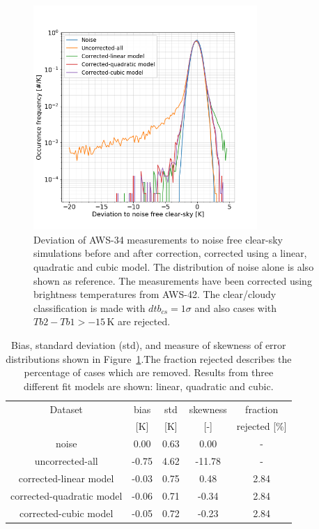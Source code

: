 \documentclass[12pt]{article}
\begin{document}
\begin{figure}[!tb]
	\centering
	\includegraphics[height=85mm]{PDF_corrected_AWS-34_AWS-42_allfits}
	\caption{Deviation of AWS-34 measurements to noise free clear-sky
      simulations before and after correction, corrected using a linear,
      quadratic and cubic model. The distribution of noise alone is also shown
      as reference. The measurements have been corrected using brightness
      temperatures from AWS-42. The clear/cloudy classification is made with $dtb_{cs} = 1\sigma$ and also cases with $Tb2 - Tb1 > -15$\,K are rejected.}
	\label{fig:correction:c34-42:fit}
\end{figure}
%
\begin{table}[!tb]
	\centering
	\begin{tabular}[b]{c|c|c|c|c}
		Dataset  		  &   bias &   std &   skewness  & fraction  \\
		&   [K]  &   [K] & [-] & rejected [\%]\\
		\hline
		noise                     &   0.00 &  0.63 &               0.00 &                - \\
		uncorrected-all           &  -0.75 &  4.62 &             -11.78 &                - \\
		corrected-linear model    &  -0.03 &  0.75 &               0.48 &                2.84 \\
		corrected-quadratic model &  -0.06 &  0.71 &              -0.34 &                2.84 \\
		corrected-cubic model     &  -0.05 &  0.72 &              -0.23 &                2.84 \\
		\hline
	\end{tabular}
	\caption{Bias, standard deviation (std), and measure of skewness of error distributions
		shown in Figure~\ref{fig:correction:c34-42:fit}.The fraction rejected describes the percentage of cases which are removed. Results from three different fit models are shown: linear, quadratic and cubic.}
	\label{tab:correction:stats:34:42:allfits}
\end{table}
\end{document}
